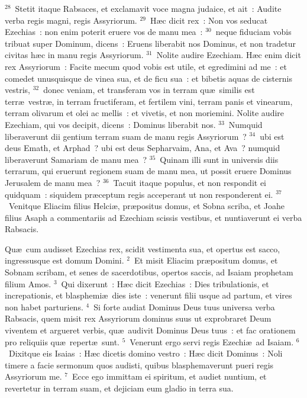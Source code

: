 ${}^{28}$~Stetit itaque Rabsaces, et exclamavit voce magna judaice, et ait~: Audite verba regis magni, regis Assyriorum.
${}^{29}$~H\ae c dicit rex~: Non vos seducat Ezechias~: non enim poterit eruere vos de manu mea~:
${}^{30}$~neque fiduciam vobis tribuat super Dominum, dicens~: Eruens liberabit nos Dominus, et non tradetur civitas h\ae c in manu regis Assyriorum.
${}^{31}$~Nolite audire Ezechiam. H\ae c enim dicit rex Assyriorum~: Facite mecum quod vobis est utile, et egredimini ad me~: et comedet unusquisque de vinea sua, et de ficu sua~: et bibetis aquas de cisternis vestris,
${}^{32}$~donec veniam, et transferam vos in terram qu\ae\ similis est terr\ae\ vestr\ae , in terram fructiferam, et fertilem vini, terram panis et vinearum, terram olivarum et olei ac mellis~: et vivetis, et non moriemini. Nolite audire Ezechiam, qui vos decipit, dicens~: Dominus liberabit nos.
${}^{33}$~Numquid liberaverunt dii gentium terram suam de manu regis Assyriorum~?
${}^{34}$~ubi est deus Emath, et Arphad~? ubi est deus Sepharvaim, Ana, et Ava~? numquid liberaverunt Samariam de manu mea~?
${}^{35}$~Quinam illi sunt in universis diis terrarum, qui eruerunt regionem suam de manu mea, ut possit eruere Dominus Jerusalem de manu mea~?
${}^{36}$~Tacuit itaque populus, et non respondit ei quidquam~: siquidem pr\ae ceptum regis acceperant ut non responderent ei.
${}^{37}$~Venitque Eliacim filius Helci\ae , pr\ae positus domus, et Sobna scriba, et Joahe filius Asaph a commentariis ad Ezechiam scissis vestibus, et nuntiaverunt ei verba Rabsacis.

\lettrine[lines=10,image=true,loversize=0.05,lraise=-0.03]{Q}{}u\ae\ cum audisset Ezechias rex, scidit vestimenta sua, et opertus est sacco, ingressusque est domum Domini.
${}^{2}$~Et misit Eliacim pr\ae positum domus, et Sobnam scribam, et senes de sacerdotibus, opertos saccis, ad Isaiam prophetam filium Amos.
${}^{3}$~Qui dixerunt~: H\ae c dicit Ezechias~: Dies tribulationis, et increpationis, et blasphemi\ae\ dies iste~: venerunt filii usque ad partum, et vires non habet parturiens.
${}^{4}$~Si forte audiat Dominus Deus tuus universa verba Rabsacis, quem misit rex Assyriorum dominus suus ut exprobraret Deum viventem et argueret verbis, qu\ae\ audivit Dominus Deus tuus~: et fac orationem pro reliquiis qu\ae\ repert\ae\ sunt.
${}^{5}$~Venerunt ergo servi regis Ezechi\ae\ ad Isaiam.
${}^{6}$~Dixitque eis Isaias~: H\ae c dicetis domino vestro~: H\ae c dicit Dominus~: Noli timere a facie sermonum quos audisti, quibus blasphemaverunt pueri regis Assyriorum me.
${}^{7}$~Ecce ego immittam ei spiritum, et audiet nuntium, et revertetur in terram suam, et dejiciam eum gladio in terra sua.


